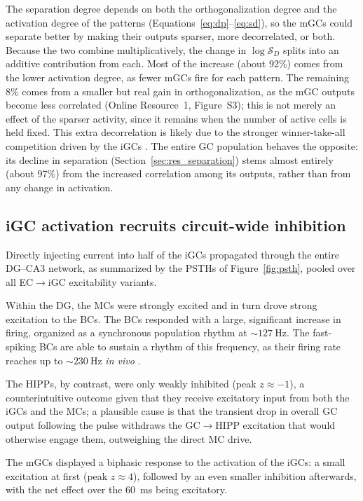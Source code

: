 \documentclass[pdflatex,sn-basic]{sn-jnl}%
\theoremstyle{thmstyleone}%
\theoremstyle{thmstyletwo}%
\theoremstyle{thmstylethree}%
\begin{document}
The separation degree depends on both the orthogonalization degree and the activation degree of the patterns
(Equations~\ref{eq:dp}--\ref{eq:sd}), so the mGCs could separate better by making their outputs sparser, more decorrelated, or
both. Because the two combine multiplicatively, the change in $\log \mathcal{S}_D$ splits into an additive contribution from each.
Most of the increase (about 92\%) comes from the lower activation degree, as fewer mGCs fire for each pattern. The remaining 8\%
comes from a smaller but real gain in orthogonalization, as the mGC outputs become less correlated (Online Resource~1,
Figure~S3); this is not merely an effect of the sparser activity, since it remains when the number of active cells is held fixed. This extra
decorrelation is likely due to the stronger winner-take-all competition driven by the iGCs \citep{coultripCortical1992}. The
entire GC population behaves the opposite: its decline in separation (Section~\ref{sec:res_separation}) stems almost entirely
(about 97\%) from the increased correlation among its outputs, rather than from any change in activation.

\subsection{iGC activation recruits circuit-wide inhibition}\label{sec:res_activation}

Directly injecting current into half of the iGCs propagated through the entire DG--CA3 network, as summarized by the PSTHs of
Figure~\ref{fig:psth}, pooled over all EC$\to$iGC excitability variants.

Within the DG, the MCs were strongly excited and in turn drove strong excitation to the BCs. The BCs responded with a large,
significant increase in firing, organized as a synchronous population rhythm at $\sim\SI{127}{\hertz}$. The fast-spiking BCs are
able to sustain a rhythm of this frequency, as their firing rate reaches up to $\sim\SI{230}{\hertz}$ \textit{in vivo}
\citep{lubkeSpecialized1998}.

The HIPPs, by contrast, were only weakly inhibited (peak $z \approx -1$), a counterintuitive outcome given that they receive
excitatory input from both the iGCs and the MCs; a plausible cause is that the transient drop in overall GC output following the
pulse withdraws the GC$\to$HIPP excitation that would otherwise engage them, outweighing the direct MC drive.

The mGCs displayed a biphasic response to the activation of the iGCs: a small excitation at first (peak $z \approx 4$), followed
by an even smaller inhibition afterwards, with the net effect over the \SI{60}{\milli\second} being excitatory.
\end{document}
